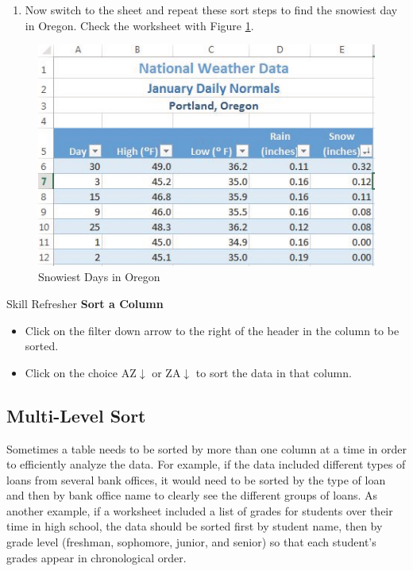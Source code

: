 \begin{enumerate}
	\item Now switch to the  sheet and repeat these sort steps to find the snowiest day in Oregon. Check the worksheet with Figure \ref{05:fig10}.
\end{enumerate}

\begin{figure}[H]
	\centering
	\includegraphics[width=\maxwidth{.95\linewidth}]{gfx/ch05_fig10}
	\caption{Snowiest Days in Oregon}
	\label{05:fig10}
\end{figure}

\begin{center}
	\begin{sklbox}{Skill Refresher}
		\textbf{Sort a Column}
		\\
		\begin{itemize}
			\setlength{\itemsep}{0pt}
			\setlength{\parskip}{0pt}
			\setlength{\parsep}{0pt}

			\item Click on the filter down arrow to the right of the header in the column to be sorted.
			\item Click on the choice AZ$ \downarrow $ or ZA$ \downarrow $ to sort the data in that column.
						
		\end{itemize}
	\end{sklbox}
\end{center}

\subsection{Multi-Level Sort}

Sometimes a table needs to be sorted by more than one column at a time in order to efficiently analyze the data. For example, if the data included different types of loans from several bank offices, it would need to be sorted by the type of loan and then by bank office name to clearly see the different groups of loans. As another example, if a worksheet included a list of grades for students over their time in high school, the data should be sorted first by student name, then by grade level (freshman, sophomore, junior, and senior) so that each student's grades appear in chronological order.

